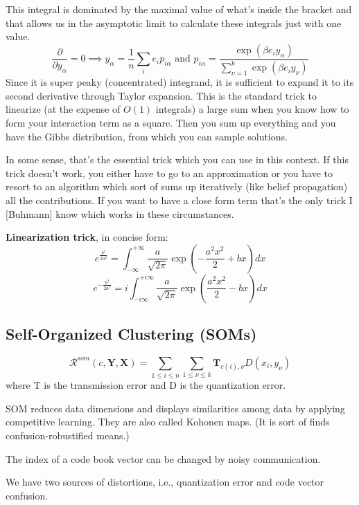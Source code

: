 \documentclass[12pt]{article}
\begin{document}
This integral is dominated by the maximal value of what's inside the bracket and that allows us in the asymptotic limit to calculate these integrals just with one value.
\[ \frac{\partial}{\partial y_{\alpha}} = 0 \implies y_{\alpha} = \frac{1}{n} \sum_i e_i p_{i\alpha} \text{ and } p_{i\alpha} = \frac{\exp(\beta e_i y_{\alpha})}{\sum_{\nu=1}^k \exp(\beta e_i y_{\nu})} \]
Since it is super peaky (concentrated) integrand, it is sufficient to expand it to its second derivative through Taylor expansion. This is the standard trick to linearize (at the expense of $O(1)$ integrals) a large sum when you know how to form your interaction term as a square. Then you sum up everything and you have the Gibbs distribution, from which you can sample solutions.
\par In some sense, that's the essential trick which you can use in this context. If this trick doesn't work, you either have to go to an approximation or you have to resort to an algorithm which sort of sums up iteratively (like belief propagation) all the contributions. If you want to have a close form term that's the only trick I [Buhmann] know which works in these circumstances.
\par \textbf{Linearization trick}, in concise form:
\[ e^{\frac{b^2}{2a^2}} = \int_{-\infty}^{+\infty} \frac{a}{\sqrt{2\pi}} \exp\left(- \frac{a^2 x^2}{2} + bx\right) dx \]
\[ e^{-\frac{b^2}{2a^2}} = i \int_{-i\infty}^{+i\infty} \frac{a}{\sqrt{2\pi}} \exp\left( \frac{a^2 x^2}{2} - bx\right) dx \]

\subsection{Self-Organized Clustering (SOMs)}
\[\mathcal{R}^{som}(c,\mathbf{Y},\mathbf{X}) = \sum_{1\leq i \leq n} \sum_{1\leq \nu \leq k} \mathbf{T}_{c(i),\nu} D(x_i,y_{\nu})\]
where T is the transmission error and D is the quantization error.
\ulb
\item SOM reduces data dimensions and displays similarities among data by applying competitive learning. They are also called Kohonen maps. (It is sort of finds confusion-robustified means.)
\item The index of a code book vector can be changed by noisy communication.
\item We have two sources of distortions, i.e., quantization error and code vector confusion.
\ule
\end{document}
